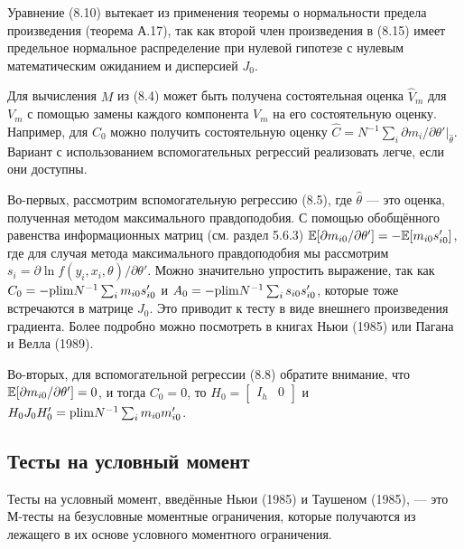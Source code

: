 Уравнение (8.10) вытекает из применения теоремы о нормальности предела произведения (теорема А.17), так как второй член произведения в (8.15) имеет предельное нормальное распределение при нулевой гипотезе с нулевым математическим ожиданием и дисперсией $J_0$.

Для вычисления $M$ из (8.4) может быть получена состоятельная оценка $\hat{V}_m$ для $V_m$ с помощью замены каждого компонента $V_m$ на его состоятельную оценку. Например, для $C_0$ можно получить состоятельную оценку $\hat{C} = N^{-1}\sum_i \partial{m}_i/\partial{\theta'}|_{\hat{\theta}}$. Вариант с использованием вспомогательных регрессий реализовать легче, если они доступны.

Во-первых, рассмотрим вспомогательную регрессию (8.5), где $\hat{\theta}$ --- это оценка, полученная методом максимального правдоподобия. С помощью обобщённого равенства информационных матриц (см. раздел 5.6.3) $\mathbb{E}[\partial{m_{i0}}/\partial{\theta'}] = - \mathbb{E}[m_{i0}s_{i0}']$, где для случая метода максимального правдоподобия мы рассмотрим $s_i = \partial{\ln f(y_i, x_i, \theta)}/\partial{\theta'}$. Можно значительно упростить выражение, так как $C_0 = - \mathrm{plim } N^{-1}\sum_i m_{i0}s_{i0}'$ и $A_0 = - \mathrm{plim } N^{-1}\sum_i s_{i0}s_{i0}'$, которые тоже встречаются в матрице $J_0$. Это приводит к тесту в виде внешнего произведения градиента. Более подробно можно посмотреть в книгах Ньюи (1985) или Пагана и Велла (1989).

Во-вторых, для вспомогательной регрессии (8.8) обратите внимание, что $\mathbb{E}[\partial{m_{i0}}/\partial{\theta'}] = 0$, и тогда $C_0 = 0$, то $H_0 = \begin{bmatrix} I_h & 0\end{bmatrix}$ и $H_0J_0H_0' = \mathrm{plim } N^{-1}\sum_i m_{i0}m_{i0}'$.

\subsection{Тесты на условный момент}

Тесты на условный момент, введённые Ньюи (1985) и Таушеном (1985), --- это М-тесты на безусловные моментные ограничения, которые получаются из лежащего в их основе условного моментного ограничения.

